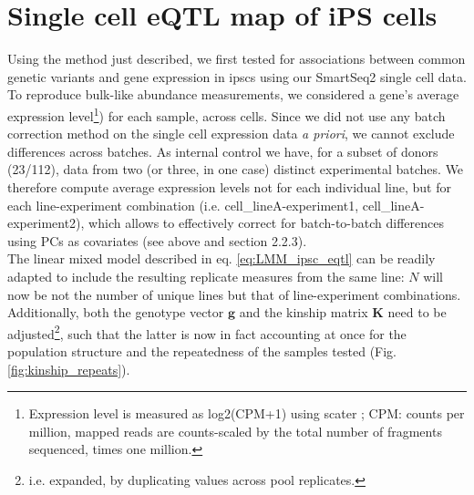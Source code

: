 
\section{Single cell eQTL map of iPS cells}

Using the method just described, we first tested for associations between common genetic variants and gene expression in \glspl{ipsc} using our SmartSeq2 single cell data.\\

To reproduce bulk-like abundance measurements, we considered a gene's average expression level\footnote{Expression level is measured as log2(CPM+1) using scater \cite{mccarthy2017scater}; CPM: counts per million, mapped reads are counts-scaled by the total number of fragments sequenced, times one million.}) for each sample, across cells.
Since we did not use any batch correction method on the single cell expression data \textit{a priori}, we cannot exclude differences across batches.
As internal control we have, for a subset of donors (23/112), data from two (or three, in one case) distinct experimental batches.
We therefore compute average expression levels not for each individual line, but for each line-experiment combination (i.e. cell\_lineA-experiment1, cell\_lineA-experiment2), which allows to effectively correct for batch-to-batch differences using PCs as covariates (see above and section
2.2.3). 
\\


The linear mixed model described in eq. \eqref{eq:LMM_ipsc_eqtl} can be readily adapted to include the resulting replicate measures from the same line: $N$ will now be not the number of unique lines but that of line-experiment combinations.
Additionally, both the genotype vector $\mathbf{g}$ and the kinship matrix $\mathbf{K}$ need to be adjusted\footnote{i.e. expanded, by duplicating values across pool replicates.}, such that the latter is now in fact accounting at once for the population structure and the repeatedness of the samples tested (Fig. \ref{fig:kinship_repeats}). \\

